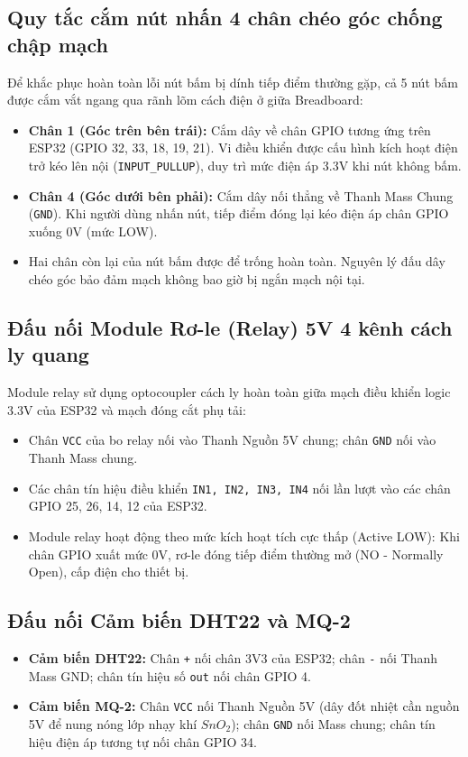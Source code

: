 \subsection{Quy tắc cắm nút nhấn 4 chân chéo góc chống chập mạch}
Để khắc phục hoàn toàn lỗi nút bấm bị dính tiếp điểm thường gặp, cả 5 nút bấm được cắm vắt ngang qua rãnh lõm cách điện ở giữa Breadboard:
\begin{itemize}
    \item \textbf{Chân 1 (Góc trên bên trái):} Cắm dây về chân GPIO tương ứng trên ESP32 (GPIO 32, 33, 18, 19, 21). Vi điều khiển được cấu hình kích hoạt điện trở kéo lên nội (\texttt{INPUT\_PULLUP}), duy trì mức điện áp 3.3V khi nút không bấm.
    \item \textbf{Chân 4 (Góc dưới bên phải):} Cắm dây nối thẳng về Thanh Mass Chung (\texttt{GND}). Khi người dùng nhấn nút, tiếp điểm đóng lại kéo điện áp chân GPIO xuống 0V (mức LOW).
    \item Hai chân còn lại của nút bấm được để trống hoàn toàn. Nguyên lý đấu dây chéo góc bảo đảm mạch không bao giờ bị ngắn mạch nội tại.
\end{itemize}

\subsection{Đấu nối Module Rơ-le (Relay) 5V 4 kênh cách ly quang}
Module relay sử dụng optocoupler cách ly hoàn toàn giữa mạch điều khiển logic 3.3V của ESP32 và mạch đóng cắt phụ tải:
\begin{itemize}
    \item Chân \texttt{VCC} của bo relay nối vào Thanh Nguồn 5V chung; chân \texttt{GND} nối vào Thanh Mass chung.
    \item Các chân tín hiệu điều khiển \texttt{IN1, IN2, IN3, IN4} nối lần lượt vào các chân GPIO 25, 26, 14, 12 của ESP32.
    \item Module relay hoạt động theo mức kích hoạt tích cực thấp (Active LOW): Khi chân GPIO xuất mức 0V, rơ-le đóng tiếp điểm thường mở (NO - Normally Open), cấp điện cho thiết bị.
\end{itemize}

\subsection{Đấu nối Cảm biến DHT22 và MQ-2}
\begin{itemize}
    \item \textbf{Cảm biến DHT22:} Chân \texttt{+} nối chân 3V3 của ESP32; chân \texttt{-} nối Thanh Mass GND; chân tín hiệu số \texttt{out} nối chân GPIO 4.
    \item \textbf{Cảm biến MQ-2:} Chân \texttt{VCC} nối Thanh Nguồn 5V (dây đốt nhiệt cần nguồn 5V để nung nóng lớp nhạy khí $SnO_2$); chân \texttt{GND} nối Mass chung; chân tín hiệu điện áp tương tự nối chân GPIO 34.
\end{itemize}

